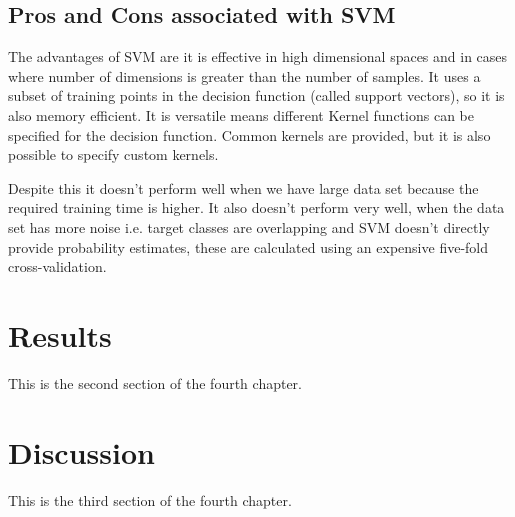 \subsection{Pros and Cons associated with SVM} \label{Pros and Cons associated with SVM}

The advantages of SVM are it is effective in high dimensional spaces and in cases where number of dimensions is greater than the number of samples. It uses a subset of training points in the decision function (called support vectors), so it is also memory efficient. It is versatile means different Kernel functions can be specified for the decision function. Common kernels are provided, but it is also possible to specify custom kernels. \par

Despite this it doesn’t perform well when we have large data set because the required training time is higher. It also doesn’t perform very well, when the data set has more noise i.e. target classes are overlapping and SVM doesn’t directly provide probability estimates, these are calculated using an expensive five-fold cross-validation.




\section{Results} \label{Results}
This is the second section of the fourth chapter.
\section{Discussion} \label{Discussion}
This is the third section of the fourth chapter.